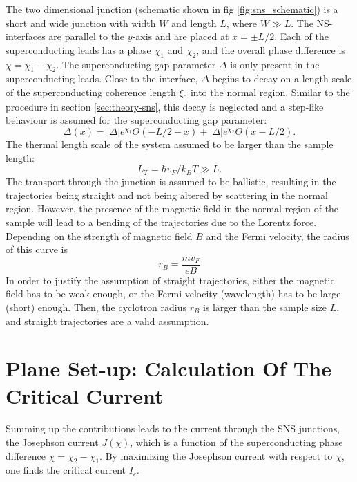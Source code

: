 The two dimensional junction (schematic shown in fig \ref{fig:sns_schematic}) is a short and wide junction with width $W$ and length $L$, where $W \gg L$. The NS-interfaces are parallel to the $y$-axis and are placed at $x = \pm L/2$. Each of the superconducting leads has a phase $\chi_{1}$ and $\chi_{2}$, and the overall phase difference is $\chi = \chi_{1} - \chi_{2}$. The superconducting gap parameter $\Delta$ is only present in the superconducting leads. Close to the interface, $\Delta$ begins to decay on a length scale of the superconducting coherence length $\xi_0$ into the normal region.
Similar to the procedure in section \ref{sec:theory-sns}, this decay is neglected and a step-like behaviour is assumed for the superconducting gap parameter:
\begin{equation}
\Delta\left( x \right) = |\Delta| e^{\chi_1} \Theta\left(-L/2 -x \right) + |\Delta| e^{\chi_2} \Theta\left(x-L/2 \right).
\label{eq:gap_parameter}
\end{equation}
The thermal length scale of the system assumed to be larger than the sample length:
\begin{equation}
L_T = \hbar v_F / k_B T \gg L.
\end{equation}
The transport through the junction is assumed to be ballistic, resulting in the trajectories being straight and not being altered by scattering in the normal region. However, the presence of the magnetic field in the normal region of the sample will lead to a bending of the trajectories due to the Lorentz force. Depending on the strength of magnetic field $B$ and the Fermi velocity, the radius of this curve is 
\begin{equation}
r_B = \frac{m v_F}{e B}
\end{equation}
In order to justify the assumption of straight trajectories, either the magnetic field has to be weak enough, or the Fermi velocity (wavelength) has to be large (short) enough. Then, the cyclotron radius $r_B$ is larger than the sample size $L$, and straight trajectories are a valid assumption. 

\section{Plane Set-up: Calculation Of The Critical Current}
Summing up the contributions leads to the current through the SNS junctions, the Josephson current $J\left( \chi \right)$, which is a function of the superconducting phase difference $\chi = \chi_2 - \chi_1$. By maximizing the Josephson current with respect to $\chi$, one finds the critical current $I_c$.


